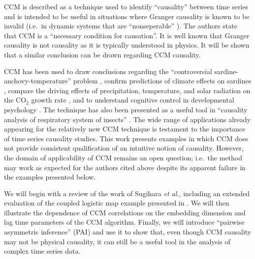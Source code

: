 \documentclass[a4paper,11pt,twocolumn]{article}
\begin{document}
CCM is described as a technique used to identify ``causality'' between time series and is intended to be useful in situations where Granger causality is known to be invalid (i.e.\ in dynamic systems that are ``nonseperable'' \cite{Sugihara2012}).  The authors state that CCM is a ``necessary condition for causation''.  It is well known \cite{Granger1980,liu2012,Roberts1985} that Granger causality is not causality as it is typically understood in physics.  It will be shown that a similar conclusion can be drawn regarding CCM causality. 

CCM has been used to draw conclusions regarding the ``controversial sardine-anchovy-temperature'' problem \cite{Sugihara2012}, confirm predictions of climate effects on sardines \cite{Deyle2013}, compare the driving effects of precipitation, temperature, and solar radiation on the CO$_2$ growth rate \cite{Wang2014}, and to understand cognitive control in developmental psychology \cite{Anastas2013}.  The technique has also been presented as a useful tool in ``causality analysis of respiratory system of insects'' \cite{Bozorgmagham2013}.  The wide range of applications already appearing for the relatively new CCM technique is testament to the importance of time series causality studies.  This work presents examples in which CCM does not provide consistent qualification of an intuitive notion of causality.  However, the domain of applicability of CCM remains an open question; i.e.\ the method may work as expected for the authors cited above despite its apparent failure in the examples presented below. 

We will begin with a review of the work of Sugihara {\em et al.}, including an extended evaluation of the coupled logistic map example presented in \cite{Sugihara2012}.  We will then illustrate the dependence of CCM correlations on the embedding dimension and lag time parameters of the CCM algorithm.  Finally, we will introduce ``pairwise asymmetric inference'' (PAI) and use it to show that, even though CCM causality may not be physical causality, it can still be a useful tool in the analysis of complex time series data.
\end{document}
